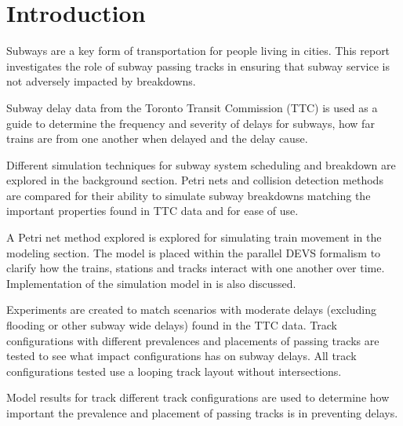 \section{Introduction}

Subways are a key form of transportation for people living in cities. This
report investigates the role of subway passing tracks in ensuring that subway
service is not adversely impacted by breakdowns.

Subway delay data from the Toronto Transit Commission (TTC) is used as a guide
to determine the frequency and severity of delays for subways, how far trains 
are from one another when delayed and the delay cause.

Different simulation techniques for subway system scheduling and breakdown are
explored in the background section. Petri nets and collision detection methods
are compared for their ability to simulate subway breakdowns matching the
important properties found in TTC data and for ease of use. 

A Petri net method explored is explored for simulating train movement in the
modeling section. The model is placed within the parallel DEVS formalism to
clarify how the trains, stations and tracks interact with one another over time.
Implementation of the simulation model in  is also discussed.

Experiments are created to match scenarios with moderate delays (excluding
flooding or other subway wide delays) found in the TTC data. Track
configurations with different prevalences and placements of passing tracks are
tested to see what impact configurations has on subway delays. All track
configurations tested use a looping track layout without intersections.

Model results for track different track configurations are used to determine how
important the prevalence and placement of passing tracks is in preventing
delays. 